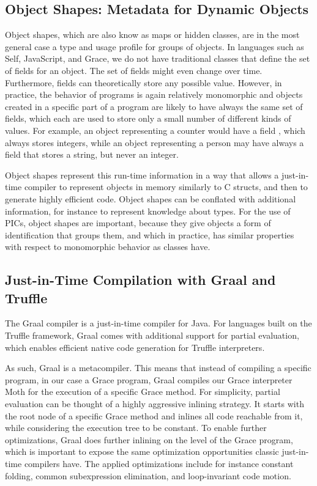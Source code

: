 \subsection{Object Shapes: Metadata for Dynamic Objects}
\label{sec:background-obj-shape}

Object shapes\citep{woss2014object},
which are also know as maps\citep{Self} or hidden classes,
are in the most general case a type and usage profile for groups of objects.
In languages such as Self, JavaScript, and Grace,
we do not have traditional classes that define the set of fields for an object.
The set of fields might even change over time.
Furthermore, fields can theoretically store any possible value.
However, in practice, the behavior of programs is again relatively monomorphic
and objects created in a specific part of a  program are likely
to have always the same set of fields, which each are used to store only
a small number of different kinds of values.
For example, an object representing a counter would have a field ,
which always stores integers,
while an object representing a person may have always a field 
that stores a string, but never an integer.

Object shapes represent this run-time information in a way that allows a
just-in-time compiler to
represent objects in memory similarly to C structs, and then to 
generate highly efficient code.
Object shapes can be conflated with additional information,
for instance to represent knowledge about types\citep{Bauman2017,Richards2017}.
For the use of PICs, object shapes are important,
because they give objects a form of identification that groups them,
and which in practice, has similar properties with respect to monomorphic
behavior as classes have.

\subsection{Just-in-Time Compilation with Graal and Truffle}
\label{sec:background-graal-pe}

The Graal compiler is a just-in-time compiler for Java.
For languages built on the Truffle framework,
Graal comes with  additional support for partial evaluation,
which enables efficient native code generation for
Truffle interpreters\citep{Wurthinger:2017:PPE}.

As such, Graal is a metacompiler.
This means that instead of compiling a specific program, in our case a Grace program,
Graal compiles our Grace interpreter Moth for the execution of a specific Grace method.
For simplicity, partial evaluation can be thought of a highly aggressive inlining strategy.
It starts with the root node of a specific Grace method
and inlines all code reachable from it, while considering the execution tree
to be constant.
To enable further optimizations,
Graal does further inlining on the level of the Grace program,
which is important to expose the same optimization opportunities
classic just-in-time compilers have.
The applied optimizations include for instance
constant folding, common subexpression elimination, and loop-invariant code motion.

